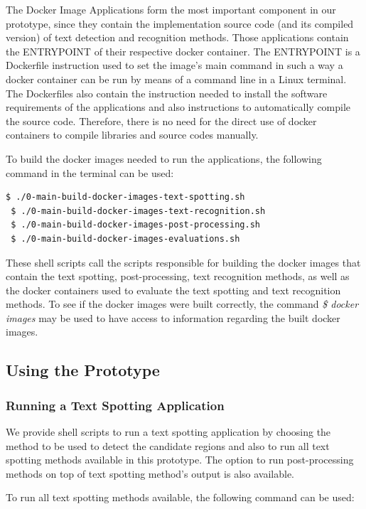 The Docker Image Applications form the most important component in our prototype, since they contain the implementation source code (and its compiled version) of text detection and recognition methods. Those applications contain the \textsc{ENTRYPOINT} of their respective docker container. The \textsc{ENTRYPOINT} is a Dockerfile instruction used to set the image's main command in such a way  a docker container can be run by means of a command line in a Linux terminal. The Dockerfiles also contain the instruction needed to install the software requirements of the applications and also instructions to automatically compile the source code. Therefore, there is no need for the direct use of docker containers to compile libraries and source codes manually.

To build the docker images needed to run the applications, the following command in the terminal can be used:
%
\begin{lstlisting}[style=fancyterminal]
 $ ./0-main-build-docker-images-text-spotting.sh
 $ ./0-main-build-docker-images-text-recognition.sh
 $ ./0-main-build-docker-images-post-processing.sh
 $ ./0-main-build-docker-images-evaluations.sh
\end{lstlisting}

These shell scripts call the scripts responsible for building the docker images that contain the text spotting, post-processing, text recognition methods, as well as the docker containers used to evaluate the text spotting and text recognition methods. To see if the docker images were built correctly, the command \emph{\$ docker images} may be used to have access to information regarding the built docker images.

\subsection{Using the Prototype}
\label{sec:using}

\subsubsection{Running a Text Spotting Application}

We provide shell scripts to run a text spotting application by choosing the method to be used to detect the candidate regions and also to run all text spotting methods available in this prototype. The option to run post-processing methods on top of text spotting method's output is also available.  

To run all text spotting methods available, the following command can be used:

